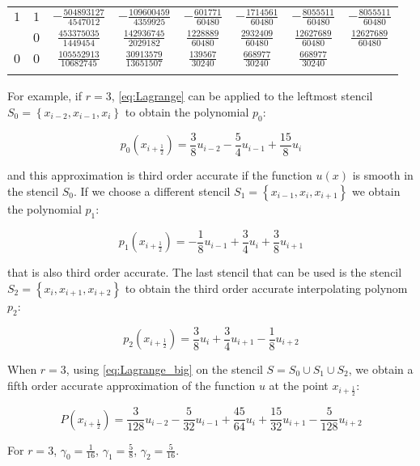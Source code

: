 \begin{table}
\begin{center}
\begin{tabular}{cccccccc}
      $1$  &  $1$  &  $-\frac{ 504893127}{ 4547012}$  &  $-\frac{ 109600459}{ 4359925}$  &  $-\frac{ 601771}{60480}$  &  $-\frac{1714561}{60480}$  &  $-\frac{ 8055511}{60480}$  &  $-\frac{ 8055511}{60480}$  \\ \addlinespace
           &  $0$  &  $ \frac{ 453375035}{ 1449454}$  &  $ \frac{ 142936745}{ 2029182}$  &  $ \frac{1228889}{60480}$  &  $ \frac{2932409}{60480}$  &  $ \frac{12627689}{60480}$  &  $ \frac{12627689}{60480}$  \\ \addlinespace
      $0$  &  $0$  &  $ \frac{ 105552913}{10682745}$  &  $ \frac{  30913579}{13651507}$  &  $ \frac{ 139567}{30240}$  &  $ \frac{  668977}{30240}$  &  $ \frac{  668977}{30240}$  \\ \addlinespace
      \midrule
      \bottomrule
    \end{tabular}
  \end{center}
\end{table}

For example, if $r=3$, \eqref{eq:Lagrange} can be applied to the leftmost stencil $S_0=\left\{ x_{i-2}, x_{i-1}, x_i \right\}$ to obtain the polynomial $p_0$:

\begin{equation}
  \label{eq:pol_0}
  p_0(x_{i+\frac{1}{2}}) = \frac{3}{8} u_{i-2} - \frac{5}{4} u_{i-1} + \frac{15}{8} u_i
\end{equation}

and this approximation is third order accurate if the function $u(x)$ is smooth in the stencil $S_0$. If we choose a different stencil $S_1=\left\{ x_{i-1}, x_{i}, x_{i+1} \right\}$ we obtain the polynomial $p_1$:

\begin{equation}
  \label{eq:pol_1}
  p_1(x_{i+\frac{1}{2}}) = -\frac{1}{8} u_{i-1} + \frac{3}{4} u_i + \frac{3}{8} u_{i+1}
\end{equation}

that is also third order accurate. The last stencil that can be used is the stencil $S_2=\left\{ x_{i}, x_{i+1}, x_{i+2} \right\}$ to obtain the third order accurate interpolating polynom $p_2$:

\begin{equation}
  \label{eq:pol_2}
  p_2(x_{i+\frac{1}{2}}) = \frac{3}{8} u_i + \frac{3}{4} u_{i+1} - \frac{1}{8} u_{i+2}
\end{equation}

When $r=3$, using \eqref{eq:Lagrange_big} on the stencil $S= S_0 \cup S_1 \cup S_2$, we obtain a fifth order accurate approximation of the function $u$ at the point $x_{i+\frac{1}{2}}$:

\begin{equation}
  \label{eq:pol_union}
  P(x_{i+\frac{1}{2}}) = \frac{3}{128} u_{i-2} - \frac{5}{32} u_{i-1} + \frac{45}{64} u_i + \frac{15}{32} u_{i+1} - \frac{5}{128} u_{i+2}
\end{equation}

For $r=3$, $\gamma_0 = \frac{1}{16}$, $\gamma_1 = \frac{5}{8}$, $\gamma_2 = \frac{5}{16}$.
